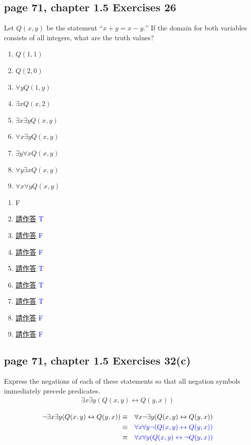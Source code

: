 \documentclass[sigconf]{acmart}
\newcommand{\answer}[2]{%
  \if\relax\detokenize{#2}\relax
    \underline{\mbox{請作答}}%
  \else
    \textcolor{blue}{#2}%
  \fi
}
\begin{document}
\subsection{page 71, chapter 1.5 Exercises 26}
\begin{shaded}
    Let $Q(x, y)$ be the statement $“x + y = x - y.”$ If the domain for both variables consists of all integers, what are the truth values?
    \begin{enumerate}[label=(\alph*)]
        \item $Q(1,1)$
        \item $Q(2,0)$
        \item $\forall y Q(1,y)$
        \item $\exists x Q(x,2)$
        \item $\exists x \exists y Q(x,y)$
        \item $\forall x \exists y Q(x,y)$
        \item $\exists y \forall x Q(x,y)$
        \item $\forall y \exists x Q(x,y)$
        \item $\forall x \forall y Q(x,y)$
    \end{enumerate}
\end{shaded} 
\begin{enumerate}[label=(\alph*)]
	\item F
	\item \answer{1.5.26b}{T}
	\item \answer{1.5.26c}{F}
	\item \answer{1.5.26d}{F}
	\item \answer{1.5.26e}{T}
	\item \answer{1.5.26f}{T}
	\item \answer{1.5.26g}{T}
	\item \answer{1.5.26h}{F}
	\item \answer{1.5.26i}{F}
\end{enumerate}

\subsection{page 71, chapter 1.5 Exercises 32(c)}
\begin{shaded}
    Express the negations of each of these statements so that all negation symbols immediately precede predicates.
    \begin{eqnarray*}
    	\exists x \exists y (Q(x,y) \leftrightarrow Q(y,x))
    \end{eqnarray*}
\end{shaded} 
\begin{eqnarray*}
	\neg \exists x \exists y (Q(x,y) \leftrightarrow Q(y,x)) & \equiv & \forall x \neg \exists y
	(Q(x,y) \leftrightarrow Q(y,x)) \\
	& \equiv & \answer{1.5.32c.step2}{\forall x \forall y \neg (Q(x,y) \leftrightarrow Q(y,x))} \\
	& \equiv & \answer{1.5.32c.step3}{\forall x \forall y (Q(x,y) \leftrightarrow \neg Q(y,x))}
\end{eqnarray*}
\end{document}
